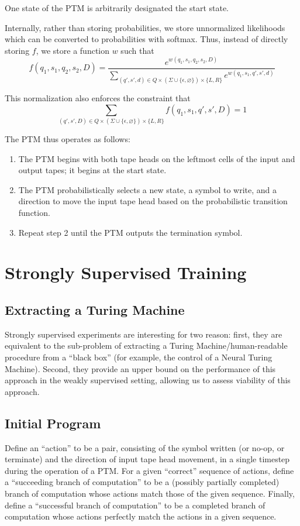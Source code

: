 \documentclass{article}
\begin{document}
One state of the PTM is arbitrarily designated the start state.

Internally, rather than storing probabilities, we store unnormalized likelihoods which can be converted to probabilities with softmax. Thus, instead of directly storing $f$, we store a function $w$ such that
\[ f(q_1, s_1, q_2, s_2, D) = \frac{e^{w(q_1, s_1, q_2, s_2, D)}}{\sum_{(q', s', d) \in Q \times (\Sigma \cup \{\epsilon, \varnothing\}) \times \{L, R\}}e^{w(q_1, s_1, q', s', d)}} \]

This normalization also enforces the constraint that 
\[ \sum_{(q', s', D) \in Q \times (\Sigma \cup \{\epsilon, \varnothing\}) \times \{L, R\}}f(q_1, s_1, q', s', D) = 1\]

The PTM thus operates as follows:
\begin{enumerate}
    \item The PTM begins with both tape heads on the leftmost cells of the input and output tapes; it begins at the start state.
    \item The PTM probabilistically selects a new state, a symbol to write, and a direction to move the input tape head based on the probabilistic transition function. 
    \item Repeat step 2 until the PTM outputs the termination symbol.
\end{enumerate}

\section{Strongly Supervised Training}

\subsection{Extracting a Turing Machine}
Strongly supervised experiments are interesting for two reason: first, they are equivalent to the sub-problem of extracting a Turing Machine/human-readable procedure from a ``black box'' (for example, the control of a Neural Turing Machine). Second, they provide an upper bound on the performance of this approach in the weakly supervised setting, allowing us to assess viability of this approach.

\subsection{Initial Program}
Define an ``action'' to be a pair, consisting of the symbol written (or no-op, or terminate) and the direction of input tape head movement, in a single timestep during the operation of a PTM. For a given ``correct'' sequence of actions, define a ``succeeding branch of computation'' to be a (possibly partially completed) branch of computation whose actions match those of the given sequence. Finally, define a ``successful branch of computation'' to be a completed branch of computation whose actions perfectly match the actions in a given sequence. 
\end{document}
